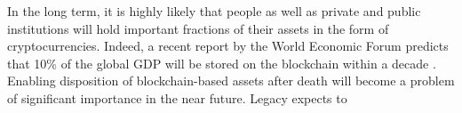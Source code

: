 In the long term, it is highly likely that people as well as private and public institutions will hold important fractions of their assets in the form of cryptocurrencies. Indeed, a recent report by the World Economic Forum predicts that 10\% of the global GDP will be stored on the blockchain within a decade \cite{WEF2017}.  
Enabling disposition of blockchain-based assets after death will become a problem of significant importance in the near future.
Legacy expects to 




